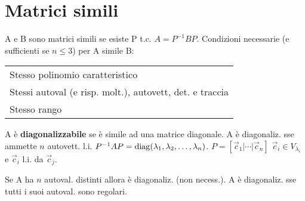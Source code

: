 \section{Matrici simili}

A e B sono matrici simili se esiste P t.c. $A = P^{-1}BP$. Condizioni necessarie (e sufficienti se $n \le 3$) per A simile B:

\begin{tabular}{l}
	Stesso polinomio caratteristico \\
	Stessi autoval (e risp. molt.), autovett, det. e traccia \\
	Stesso rango
\end{tabular}

A è \textbf{diagonalizzabile} se è simile ad una matrice diagonale. A è diagonaliz. sse ammette $n$ autovett. l.i. $P^{-1}AP = \mathrm{diag}(\lambda_1, \lambda_2, \dots, \lambda_n)$. $P=[ \vec{c}_1 | \cdots | \vec{c}_n ]$ $\vec{c}_i \in V_{\lambda_i}$ e $\vec{c}_i$ l.i. da $\vec{c}_j$.

Se A ha $n$ autoval. distinti allora è diagonaliz. (non necess.). A è diagonaliz. sse tutti i suoi autoval. sono regolari.
